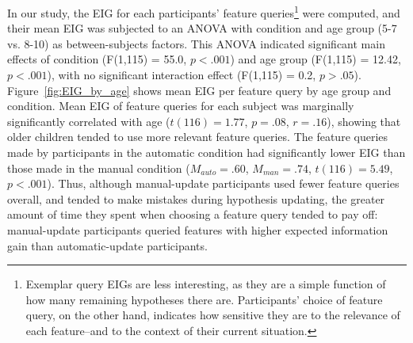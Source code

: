 \documentclass[man,floatsintext]{apa6}
\begin{document}
In our study, the EIG for each participants' feature queries\footnote{Exemplar query EIGs are 
less interesting, as they are a simple function of how many remaining hypotheses 
there are. Participants' choice of feature query, on the other hand, indicates how 
sensitive they are to the relevance of each feature--and to the context of their 
current situation.} were computed, and their mean EIG was 
subjected to an ANOVA with condition and age group (5-7 vs. 8-10) as between-subjects factors. 
This ANOVA indicated significant main effects of condition (F(1,115) = 55.0, $p<.001$) 
and age group (F(1,115) = 12.42, $p<.001$), with no significant interaction effect (F(1,115) = 0.2, $p>.05$).
Figure~\ref{fig:EIG_by_age} shows mean EIG per feature query by age group and condition. Mean 
EIG of feature queries for each subject was marginally significantly correlated with 
age ($t(116)=1.77$, $p=.08$, $r=.16$), showing that older children tended to use 
more relevant feature queries. The feature queries made by participants in the 
automatic condition had significantly lower EIG than those made in the manual 
condition ($M_{auto} = .60$, $M_{man} = .74$, $t(116) = 5.49$,  $p<.001$). Thus, 
although manual-update participants used fewer feature queries overall, and tended 
to make mistakes during hypothesis updating, the greater amount of time they spent 
when choosing a feature query tended to pay off: manual-update participants 
queried features with higher expected information gain than automatic-update 
participants. 


\end{document}
